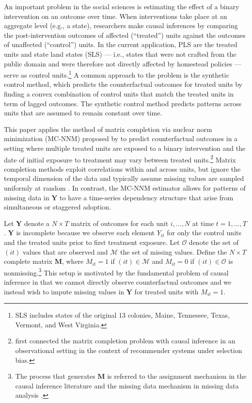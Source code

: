 \documentclass[12pt]{article}
\begin{document}
An important problem in the social sciences is estimating the effect of a binary intervention on an outcome over time. When interventions take place at an aggregate level (e.g., a state), researchers make causal inferences by comparing the post-intervention outcomes of affected (``treated'') units against the outcomes of unaffected  (``control'') units. In the current application, PLS are the treated units and state land states (SLS) --- i.e., states that were not crafted from the public domain and were therefore not directly affected by homestead policies --- serve as control units.\footnote{SLS includes states of the original 13 colonies, Maine, Tennessee, Texas, Vermont, and West Virginia.} A common approach to the problem is the synthetic control method, which predicts the counterfactual outcomes for treated units by finding a convex combination of control units that match the treated units in term of lagged outcomes. The synthetic control method predicts patterns across units that are assumed to remain constant over time. 

This paper applies the  method of matrix completion via nuclear norm minimization (MC-NNM) proposed by \citet{athey2017matrix} to predict counterfactual outcomes in a setting where multiple treated units are exposed to a binary intervention and the date of initial exposure to treatment may vary between treated units.\footnote{\citet{schnabel2016recommendations} first connected the matrix completion problem with causal inference in an observational setting in the context of recommender systems under selection bias.} Matrix completion methods \citep[e.g.,][]{mazumder2010spectral} exploit correlations within and across units, but ignore the temporal dimension of the data and typically assume missing values are sampled uniformly at random \citep{yoon2018estimating}. In contrast, the MC-NNM estimator allows for patterns of missing data in $\mathbf{Y}$ to have a time-series dependency structure that arise from simultaneous or staggered adoption.

Let $\mathbf{Y}$ denote a $N \times T$ matrix of outcomes for each unit $i, \ldots, N$ at time $t = 1, \ldots, T$. $\mathbf{Y}$ is incomplete because we observe each element $Y_{it}$ for only the control units and the treated units prior to first treatment exposure. Let $\mathcal{O}$ denote the set of $(it)$ values that are observed and $\mathcal{M}$ the set of missing values. Define the $N \times T$ complete matrix $\mathbf{M}$, where $M_{it} =1 $ if $(it) \in \mathcal{M}$ and $M_{it} = 0$ if $(it) \in \mathcal{O}$ is nonmissing.\footnote{The process that generates $\mathbf{M}$ is referred to the assignment mechanism in the causal inference literature \citep{imbens2015causal} and the missing data mechanism in missing data analysis \citep{little2014}.} This setup is motivated by the fundamental problem of causal inference \citep{holland1986statistics} in that we cannot directly observe counterfactual outcomes and we instead wish to impute missing values in $\mathbf{Y}$ for treated units with $M_{it}=1$. 
\end{document}
